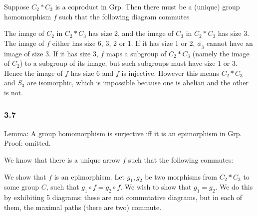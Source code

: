 \documentclass{article}
\def\Z{\mathbb{Z}}
\begin{document}
Suppose $C_2 * C_3$ is a coproduct in Grp. Then there must be a (unique) group homomorphism $f$ such that the following diagram commutes


The image of $C_2$ in $C_2 * C_3$ has size 2, and the image of $C_3$ in $C_2 * C_3$ has size 3. The image of $f$ either has size 6, 3, 2 or 1. If it has size 1 or 2, $\phi_3$ cannot have an image of size 3. If it has size 3, $f$ maps a subgroup of $C_2 * C_3$ (namely the image of $C_2$) to a subgroup of its image, but such subgroups must have size 1 or 3. Hence the image of $f$ has size 6 and $f$ is injective. However this means $C_2 * C_3$ and $S_3$ are isomorphic, which is impossible because one is abelian and the other is not.

\subsubsection*{3.7}

Lemma: A group homomorphism is surjective iff it is an epimorphism in Grp. Proof: omitted.

We know that there is a unique arrow $f$ such that the following commutes:


We show that $f$ is an epimorphism. Let $g_1, g_2$ be two morphisms from $C_2 * C_3$ to some group $C$, such that $g_1 \circ f = g_2 \circ f$. We wish to show that $g_1 = g_2$. We do this by exhibiting 5 diagrams; these are not commutative diagrams, but in each of them, the maximal paths (there are two) commute.

\end{document}
